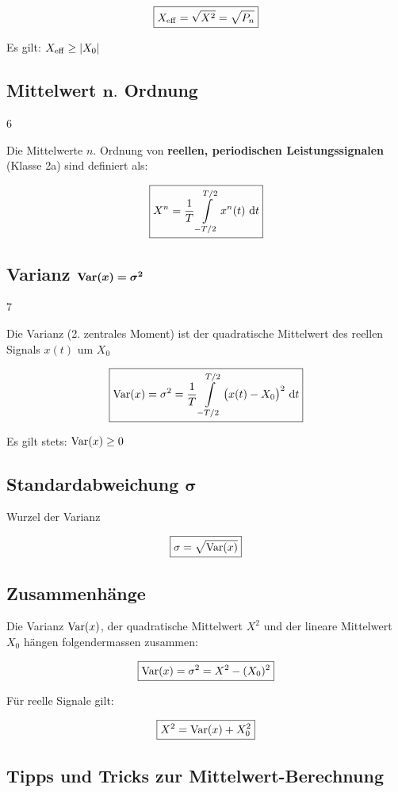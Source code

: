 $$ \boxed{ X_{\rm eff} = \sqrt{X^2} = \sqrt{P_n}} $$

Es gilt: $X_{\rm eff} \geq \vert X_0 \vert$


\subsection[Mittelwert n. Ordnung]{Mittelwert $\bm{n.}$ Ordnung}{6}

Die Mittelwerte $n.$ Ordnung von \textbf{reellen, periodischen Leistungssignalen} (Klasse 2a) sind definiert als:

$$ \boxed{ X^n = \frac{1}{T} \int\limits_{-T/2}^{T/2} x^n(t) \, \mathop{} \! \mathrm{d} t } $$


\subsection[Varianz]{Varianz $\bm{\mathrm{Var}(x) = \sigma^2}$}{7}

Die Varianz (2. zentrales Moment) ist der quadratische Mittelwert des reellen Signals $x(t)$ um $X_0$ 

$$ \boxed{ \mathrm{Var}(x) = \sigma^2 = \frac{1}{T} \int\limits_{-T/2}^{T/2} \big( x(t) - X_0 \big)^2  \, \mathop{} \! \mathrm{d} t } $$

Es gilt stets: $\mathrm{Var}(x) \geq 0$


\subsection[Standardabweichung]{Standardabweichung $\bm{\sigma}$}

Wurzel der Varianz

$$ \boxed{ \sigma = \sqrt{\mathrm{Var}(x)} } $$


\subsection{Zusammenhänge}

Die Varianz $\mathrm{Var}(x)$, der quadratische Mittelwert $X^2$ und der lineare Mittelwert $X_0$ hängen folgendermassen zusammen:

$$ \boxed{ \mathrm{Var}(x) = \sigma^2 = X^2 - (X_0)^2 } $$

Für reelle Signale gilt:

$$ \boxed{ X^2  = \mathrm{Var}(x) + X_0^2 } $$


\subsection{Tipps und Tricks zur Mittelwert-Berechnung}

